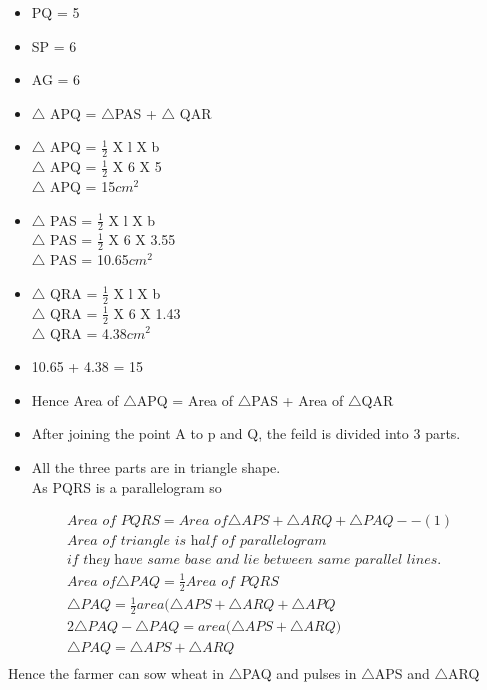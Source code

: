 \begin{frame}
\begin{itemize}
\item PQ = 5\\
\item SP = 6\\
\item AG = 6\\
\item$\triangle$ APQ = $\triangle$PAS + $\triangle$ QAR\\ 
\item$\triangle$ APQ = $\frac{1}{2}$ X l X b\\
$\triangle$ APQ = $\frac{1}{2}$ X 6 X 5\\
$\triangle$ APQ = 15$cm^2$
\item$\triangle$ PAS = $\frac{1}{2}$ X l X b\\
$\triangle$ PAS = $\frac{1}{2}$ X 6 X 3.55\\
$\triangle$ PAS = 10.65$cm^2$\\
\item$\triangle$ QRA = $\frac{1}{2}$ X l X b\\
$\triangle$ QRA = $\frac{1}{2}$ X 6 X 1.43\\
$\triangle$ QRA = 4.38$cm^2$\\
\item 10.65 + 4.38 = 15
\item Hence Area of $\triangle$APQ = Area of $\triangle$PAS + Area of $\triangle$QAR\\
\end{itemize}
\end{frame}
\begin{frame}
\begin{itemize}
\item  After joining the point A to p and Q, the feild is divided into 3 parts.\\
\item All the three parts are in triangle shape.\\
As PQRS is a parallelogram so\\
\end{itemize}
\begin{align*}
\textit{Area of PQRS} = \textit{Area of} \triangle{APS} + \triangle{ARQ} + \triangle{PAQ} --(1)\\
\textit{Area of triangle is half of parallelogram}\\\textit{if they have same base and lie between same parallel lines}. \\
\textit{Area of} \triangle{PAQ} = \frac{1}{2} \textit{Area of PQRS}\\
\triangle{PAQ} = \frac{1}{2}\textit{area}(\triangle{APS} + \triangle{ARQ} + \triangle{APQ}\\
2\triangle{PAQ} - \triangle{PAQ} = \textit{area(}\triangle{APS} + \triangle{ARQ}\textit{)}\\
\triangle{PAQ} = \triangle{APS} + \triangle{ARQ}\\
\end{align*}
Hence the farmer can sow wheat in $\triangle$PAQ and pulses in $\triangle$APS and $\triangle$ARQ\\

\end{frame}
